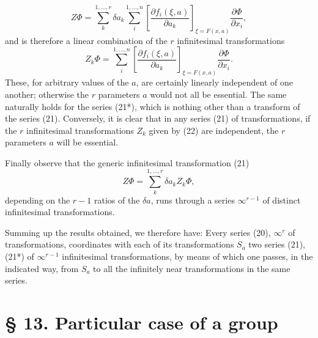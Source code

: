 \documentclass[11pt]{book}
\begin{document}
\[
 Z\Phi=\sum\limits_k^{1,\ldots,r}\delta a_k\sum\limits_i^{1,\ldots,n}\left[\frac{\partial f_i(\xi,a)}{\partial a_k}\right]_{\xi=F(x,a)}\frac{\partial\Phi}{\partial x_i},
\]
and is therefore a linear combination of the $r$ infinitesimal transformations
\begin{equation*}\tag{22}
 Z_k\Phi=\sum\limits_i^{1,\ldots,n}\left[\frac{\partial f_i(\xi,a)}{\partial a_k}\right]_{\xi=F(x,a)}\frac{\partial\Phi}{\partial x_i}.
\end{equation*}
These, for arbitrary values of the $a$, are certainly linearly independent of one another; otherwise the $r$ parameters $a$ would not all be essential. The same naturally holds for the series (21*), which is nothing other than a transform of the series (21). Conversely, it is clear that in any series (21) of transformations, if the $r$ infinitesimal transformations $Z_k$ given by (22) are independent, the $r$ parameters $a$ will be essential.

Finally observe that the generic infinitesimal transformation (21)
\[
 Z\Phi=\sum\limits_k^{1,\ldots,r}\delta a_k Z_k\Phi,
\]
depending on the $r-1$ ratios of the $\delta a$, runs through a series $\infty^{r-1}$ of distinct infinitesimal transformations.

Summing up the results obtained, we therefore have:
Every series (20), $\infty^r$ of transformations, coordinates with each of its transformations $S_a$ two series (21), (21*) of $\infty^{r-1}$ infinitesimal transformations, by means of which one passes, in the indicated way, from $S_a$ to all the infinitely near transformations in the same series.


\section*{\S{} 13. Particular case of a group}
\end{document}
